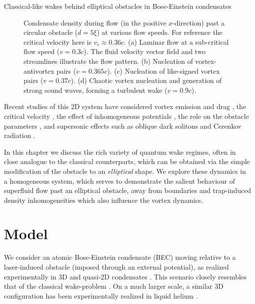 \begin{chapter}{\label{cha:wake}Classical-like wakes behind elliptical obstacles in Bose-Einstein condensates}
\begin{figure}[!ht]
  \caption{\label{fig:denstraj} Condensate density during flow (in the positive $x$-direction) past a circular obstacle ($d = 5\xi$) at various flow speeds. For reference the critical velocity here is $v_c \approx 0.36c$.  (a) Laminar flow at a sub-critical flow speed ($v=0.3c$).  The fluid velocity vector field and two streamlines illustrate the flow pattern. (b) Nucleation of vortex-antivortex pairs ($v=0.365c$).  (c) Nucleation of like-signed vortex pairs ($v=0.37c$). (d)  Chaotic vortex nucleation and generation of strong sound waves, forming a turbulent wake ($v=0.9c$).}
\end{figure}



Recent studies of this 2D system have considered vortex emission and drag \cite{nore93,jma99,win00,huepe00}, the critical velocity \cite{zwerger00,crescimanno00,berloff2000,rica2001,pham2004}, the effect of inhomogeneous potentials \cite{win00,jackson98,fujimoto11}, the role on the obstacle parameters \cite{huepe00,aioi11}, and supersonic effects such as oblique dark solitons \cite{el06} and Cerenkov radiation \cite{carusotto06}.

In this chapter we discuss the rich variety of quantum wake regimes, often in close analogue to the classical counterparts, which can be obtained via the simple modification of the obstacle to an {\it elliptical} shape. We explore these dynamics in a homogeneous system, which serves to demonstrate the salient behaviour of superfluid flow past an elliptical obstacle, away from boundaries and trap-induced density inhomogeneities which also influence the vortex dynamics.

\section{Model}

We consider an atomic Bose-Einstein condensate (BEC) moving relative to a laser-induced obstacle (imposed through 
an external potential), as realized experimentally in 3D \cite{Raman,Onofrio,Inouye,Neely} and quasi-2D condensates \cite{Neely}.  This scenario closely resembles that of the classical wake-problem \cite{taneda41,taneda112}.  On a much larger scale, a similar 
3D configuration has been experimentally realized in liquid helium 
\cite{VanSciver1999,VanSciver2005}.


\end{chapter}
